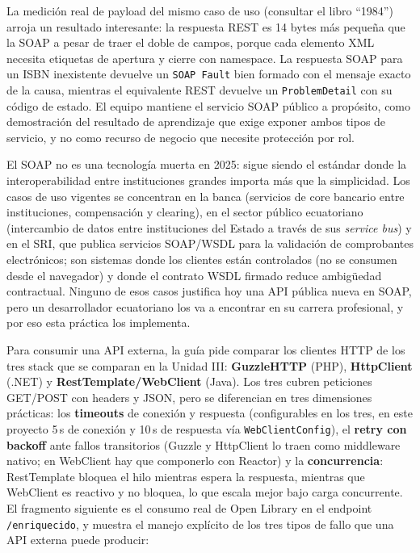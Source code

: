 \documentclass[12pt,a4paper]{article}
\begin{document}
La medición real de payload del mismo caso de uso (consultar el libro ``1984'') arroja
un resultado interesante: la respuesta REST es 14 bytes más pequeña que la SOAP a pesar
de traer el doble de campos, porque cada elemento XML necesita etiquetas de apertura y
cierre con namespace. La respuesta SOAP para un ISBN inexistente devuelve un
\texttt{SOAP Fault} bien formado con el mensaje exacto de la causa, mientras el
equivalente REST devuelve un \texttt{ProblemDetail} con su código de estado. El equipo
mantiene el servicio SOAP público a propósito, como demostración del resultado de
aprendizaje que exige exponer ambos tipos de servicio, y no como recurso de negocio que
necesite protección por rol.

El SOAP no es una tecnología muerta en 2025: sigue siendo el estándar donde la
interoperabilidad entre instituciones grandes importa más que la simplicidad. Los casos
de uso vigentes se concentran en la banca (servicios de core bancario entre
instituciones, compensación y clearing), en el sector público ecuatoriano (intercambio
de datos entre instituciones del Estado a través de sus \textit{service bus}) y en el
SRI, que publica servicios SOAP/WSDL para la validación de comprobantes electrónicos;
son sistemas donde los clientes están controlados (no se consumen desde el navegador) y
donde el contrato WSDL firmado reduce ambigüedad contractual. Ninguno de esos casos
justifica hoy una API pública nueva en SOAP, pero un desarrollador ecuatoriano los va a
encontrar en su carrera profesional, y por eso esta práctica los implementa.

Para consumir una API externa, la guía pide comparar los clientes HTTP de los tres
stack que se comparan en la Unidad III: \textbf{GuzzleHTTP} (PHP), \textbf{HttpClient}
(.NET) y \textbf{RestTemplate/WebClient} (Java). Los tres cubren peticiones GET/POST con
headers y JSON, pero se diferencian en tres dimensiones prácticas: los \textbf{timeouts}
de conexión y respuesta (configurables en los tres, en este proyecto 5\,s de conexión y
10\,s de respuesta vía \texttt{WebClientConfig}), el \textbf{retry con backoff} ante
fallos transitorios (Guzzle y HttpClient lo traen como middleware nativo; en WebClient
hay que componerlo con Reactor) y la \textbf{concurrencia}: RestTemplate bloquea el hilo
mientras espera la respuesta, mientras que WebClient es reactivo y no bloquea, lo que
escala mejor bajo carga concurrente. El fragmento siguiente es el consumo real de Open
Library en el endpoint \texttt{/enriquecido}, y muestra el manejo explícito de los tres
tipos de fallo que una API externa puede producir:
\end{document}
